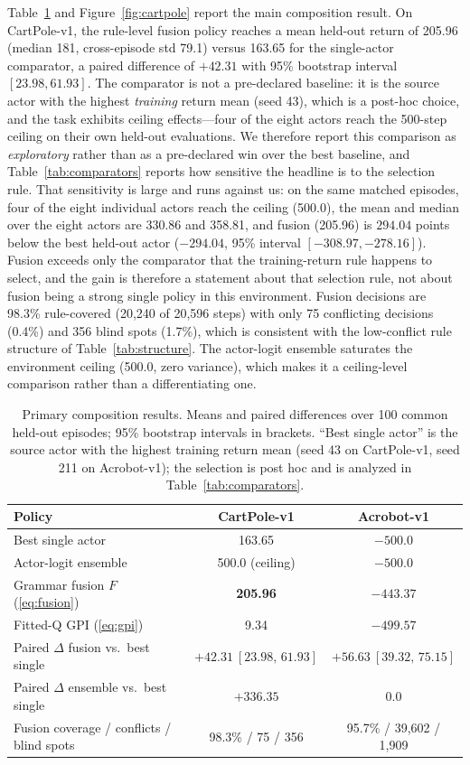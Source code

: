 \documentclass[11pt]{article}
\begin{document}
Table~\ref{tab:primary} and Figure~\ref{fig:cartpole} report the main composition result. On
CartPole-v1, the rule-level fusion policy reaches a mean held-out return of 205.96 (median 181,
cross-episode std 79.1) versus 163.65 for the single-actor comparator, a paired difference of $+42.31$
with 95\% bootstrap interval $[23.98,61.93]$. The comparator is not a pre-declared baseline: it is the
source actor with the highest \emph{training} return mean (seed 43), which is a post-hoc choice, and
the task exhibits ceiling effects---four of the eight actors reach the 500-step ceiling on their own
held-out evaluations. We therefore report this comparison as \emph{exploratory} rather than as a
pre-declared win over the best baseline, and Table~\ref{tab:comparators} reports how sensitive the
headline is to the selection rule. That sensitivity is large and runs against us: on the same matched
episodes, four of the eight individual actors reach the ceiling (500.0), the mean and median over the
eight actors are 330.86 and 358.81, and fusion (205.96) is $294.04$ points below the best held-out
actor ($-294.04$, 95\% interval $[-308.97,-278.16]$). Fusion exceeds only the comparator that the
training-return rule happens to select, and the gain is therefore a statement about that selection
rule, not about fusion being a strong single policy in this environment. Fusion decisions are
98.3\% rule-covered (20{,}240 of
20{,}596 steps) with only 75 conflicting decisions (0.4\%) and 356 blind spots (1.7\%), which is
consistent with the low-conflict rule structure of Table~\ref{tab:structure}. The actor-logit
ensemble saturates the environment ceiling (500.0, zero variance), which makes it a ceiling-level
comparison rather than a differentiating one.

\begin{table}[t]
\centering
\caption{Primary composition results. Means and paired differences over 100 common held-out
episodes; 95\% bootstrap intervals in brackets. ``Best single actor'' is the source actor with the
highest training return mean (seed 43 on CartPole-v1, seed 211 on Acrobot-v1); the selection is post
hoc and is analyzed in Table~\ref{tab:comparators}.}
\label{tab:primary}
\begin{tabular}{lcc}
\toprule
Policy & CartPole-v1 & Acrobot-v1 \\
\midrule
Best single actor & 163.65 & $-500.0$ \\
Actor-logit ensemble & 500.0 (ceiling) & $-500.0$ \\
Grammar fusion $F$ (\ref{eq:fusion}) & \textbf{205.96} & $-443.37$ \\
Fitted-Q GPI (\ref{eq:gpi}) & 9.34 & $-499.57$ \\
\midrule
Paired $\Delta$ fusion vs.\ best single & $+42.31\ [23.98,\,61.93]$ & $+56.63\ [39.32,\,75.15]$ \\
Paired $\Delta$ ensemble vs.\ best single & $+336.35$ & $0.0$ \\
Fusion coverage / conflicts / blind spots & 98.3\% / 75 / 356 & 95.7\% / 39{,}602 / 1{,}909 \\
\bottomrule
\end{tabular}
\end{table}
\end{document}
